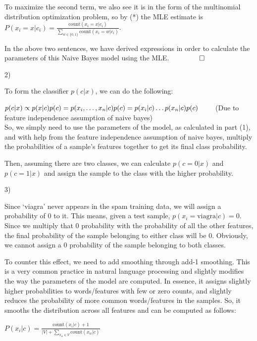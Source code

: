 To maximize the second term, we also see it is in the form of the multinomial distribution optimization problem, so by (*) the MLE estimate is $P(x_i = x \vert c_i) = \frac{\text{count}(x_i = x \vert c_i)}{\sum_{w \in \{0, 1\}} \text{count}(x_i = w \vert c_i)}$.

In the above two sentences, we have derived expressions in order to calculate the parameters of this Naive Bayes model using the MLE. $\qquad \qed$

2) 

To form the classifier $p(c \vert x)$, we can do the following:

$p(c \vert x) \\
\propto p(x \vert c)p(c) \\
= p(x_i, \dots, x_n \vert c)p(c) \\
= p(x_i \vert c)\dots p(x_n \vert c)p(c) \qquad$ (Due to feature independence assumption of naive bayes) \\

So, we simply need to use the parameters of the model, as calculated in part (1), and with help from the feature independence assumption of naive bayes, multiply the probabilities of a sample's features together to get its final class probability.

Then, assuming there are two classes, we can calculate $p(c = 0 \vert x)$ and $p(c = 1 \vert x)$ and assign the sample to the class with the higher probability.

3)

Since `viagra' never appears in the spam training data, we will assign a probability of 0 to it. This means, given a test sample, $p(x_i = \text{viagra} \vert c) = 0$. Since we multiply that 0 probability with the probability of all the other features, the final probability of the sample belonging to either class will be 0. Obviously, we cannot assign a 0 probability of the sample belonging to both classes.

To counter this effect, we need to add smoothing through add-1 smoothing. This is a very common practice in natural language processing and slightly modifies the way the parameters of the model are computed. In essence, it assigns slightly higher probabilities to words/features with few or zero counts, and slightly reduces the probability of more common words/features in the samples. So, it smooths the distribution across all features and can be computed as follows:

$P(x_i \vert c) = \frac{\text{count}(x_i \vert c) + 1}{\vert V \vert + \sum_{x_w \in V} \text{count}(x_w \vert c)}$

